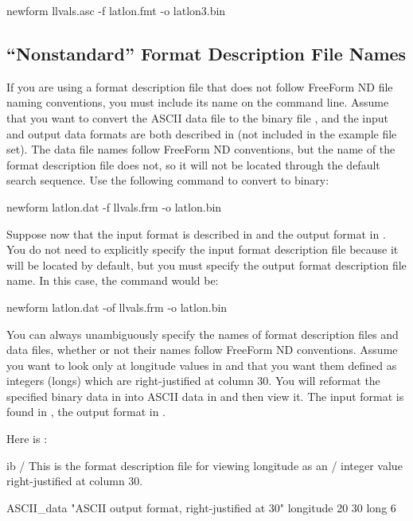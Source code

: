 \begin{example}
newform llvals.asc -f latlon.fmt -o latlon3.bin 
\end{example}

\subsection{``Nonstandard'' Format Description File Names}

If you are using a format description file that does not follow
FreeForm ND file naming conventions, you must include its name on the
command line. Assume that you want to convert the ASCII data file
 to the binary file , and the input
and output data formats are both described in  (not
included in the example file set). The data file names follow FreeForm
ND conventions, but the name of the format description file does not,
so it will not be located through the default search sequence. Use the
following command to convert to binary:

\begin{example}
newform latlon.dat -f llvals.frm -o latlon.bin 
\end{example}

Suppose now that the input format is described in  and
the output format in . You do not need to explicitly
specify the input format description file because it will be located
by default, but you must specify the output format description file
name. In this case, the command would be:

\begin{example}
newform latlon.dat -of llvals.frm -o latlon.bin 
\end{example}

You can always unambiguously specify the names of format description
files and data files, whether or not their names follow FreeForm ND
conventions. Assume you want to look only at longitude values in
 and that you want them defined as integers (longs)
which are right-justified at column 30. You will reformat the
specified binary data in  into ASCII data in
 and then view it. The input format is found in
, the output format in .

Here is :

\begin{vcode}{ib}
/ This is the format description file for viewing longitude as an 
/ integer value right-justified at column 30.

ASCII_data "ASCII output format, right-justified at 30"
longitude 20 30 long 6
\end{vcode}

